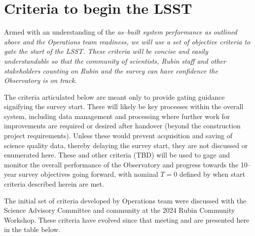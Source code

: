 \section{Criteria to begin the LSST}

Armed with an understanding of the \it{as--built} system performance as outlined above and the Operations team readiness, we will use a set of objective criteria to gate the start of the LSST. These criteria will be concise and easily understandable so that the community of scientists, Rubin staff and other stakeholders counting on Rubin and the survey can have confidence the Observatory is on track.

The criteria articulated below are meant only to provide gating guidance signifying the survey start. There will likely be key processes within the overall system, including data management and processing where further work for improvements are required or desired after handover (beyond the construction project requirements). Unless these would prevent acquisition and saving of science quality data, thereby delaying the survey start, they are not discussed or enumerated here.  These and other criteria (TBD) will be used to gage and monitor the overall performance of the Observatory and progress towards the 10--year survey objectives going forward, with nominal $T=0$ defined by when start criteria described herein are met.

The initial set of criteria developed by Operations team were discussed with the Science Advisory Committee and community at the 2024 Rubin Community Workshop. These criteria have evolved since that meeting and are presented here in the table below.

